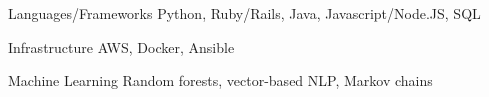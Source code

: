 

\begin{cvskills}
  \cvskill
    {Languages/Frameworks}
    {Python, Ruby/Rails, Java, Javascript/Node.JS, SQL}

  \cvskill
    {Infrastructure}
    {AWS, Docker, Ansible}

  \cvskill
    {Machine Learning}
    {Random forests, vector-based NLP, Markov chains}

\end{cvskills}

